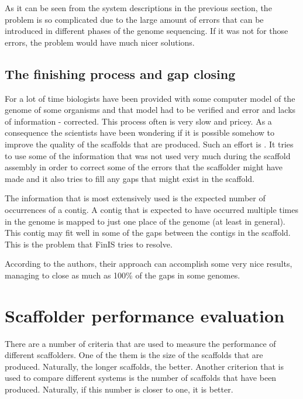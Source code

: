 \documentclass[11pt]{article}
\begin{document}
As it can be seen from the system descriptions in the previous section, the
problem is so complicated due to the large amount of errors that can be
introduced in different phases of the genome sequencing. If it was not for those
errors, the problem would have much nicer solutions.

\subsection{The finishing process and gap closing} %
\label{sub:The finishing process and gap closing}
For a lot of time biologists have been provided with some computer model of the
genome of some organisms and that model had to be verified and error and lacks
of information - corrected. This process often is very slow and pricey. As a
consequence the scientists have been wondering if it is possible somehow to
improve the quality of the scaffolds that are produced. Such an effort is
\cite{finIs}. It tries to use some of the information that was not used very
much during the scaffold assembly in order to correct some of the errors that
the scaffolder might have made and it also tries to fill any gaps that might
exist in the scaffold. 

The information that is most extensively used is the expected number of
occurrences of a contig. A contig that is expected to have occurred multiple
times in the genome is mapped to just one place of the genome (at least in
general). This contig may fit well in some of the gaps between the contigs in
the scaffold. This is the problem that FinIS tries to resolve.

According to the authors, their approach can accomplish some very nice results,
managing to close as much as 100\% of the gaps in some genomes.


\section{Scaffolder performance evaluation} %
\label{sec:Scaffolder performance evaluation}
There are a number of criteria that are used to measure the performance of
different scaffolders. One of the them is the size of the scaffolds that are
produced. Naturally, the longer scaffolds, the better. Another criterion that is
used to compare different systems is the number of scaffolds that have been
produced. Naturally, if this number is closer to one, it is better. 
\end{document}
